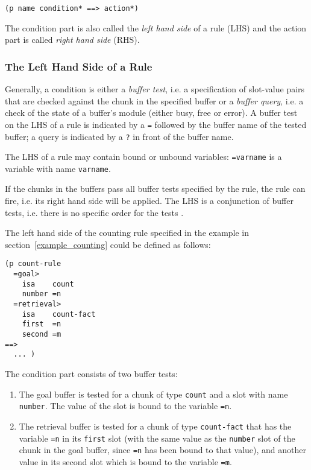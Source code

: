 \begin{lstlisting}
(p name condition* ==> action*)
\end{lstlisting}

The condition part is also called the \emph{left hand side} of a rule (LHS) and the action part is called \emph{right hand side} (RHS).

\subsubsection{The Left Hand Side of a Rule}

Generally, a condition is either a \emph{buffer test}, i.e. a specification of slot-value pairs that are checked against the chunk in the specified buffer or a \emph{buffer query}, i.e. a check of the state of a buffer's module (either busy, free or error). A buffer test on the LHS of a rule is indicated by a \lstinline|=| followed by the buffer name of the tested buffer; a query is indicated by a \lstinline|?| in front of the buffer name.

The LHS of a rule may contain bound or unbound variables: \lstinline|=varname| is a variable with name \lstinline|varname|.

If the chunks in the buffers pass all buffer tests specified by the rule, the rule can fire, i.e. its right hand side will be applied. The LHS is a conjunction of buffer tests, i.e. there is no specific order for the tests \cite[p. 165]{actr_reference}.

\begin{example}
The left hand side of the counting rule specified in the example in section~\ref{example_counting} could be defined as follows:

\begin{lstlisting}
(p count-rule
  =goal> 
    isa    count
    number =n
  =retrieval>
    isa    count-fact
    first  =n
    second =m
==>
  ... )
\end{lstlisting}

The condition part consists of two buffer tests:

\begin{enumerate}
 \item The goal buffer is tested for a chunk of type \lstinline|count| and a slot with name \lstinline|number|. The value of the slot is bound to the variable \lstinline|=n|.
 \item The retrieval buffer is tested for a chunk of type \lstinline|count-fact| that has the variable \lstinline|=n| in its \lstinline|first| slot (with the same value as the \lstinline|number| slot of the chunk in the goal buffer, since \lstinline|=n| has been bound to that value), and another value in its second slot which is bound to the variable \lstinline|=m|.
\end{enumerate}

\end{example}


